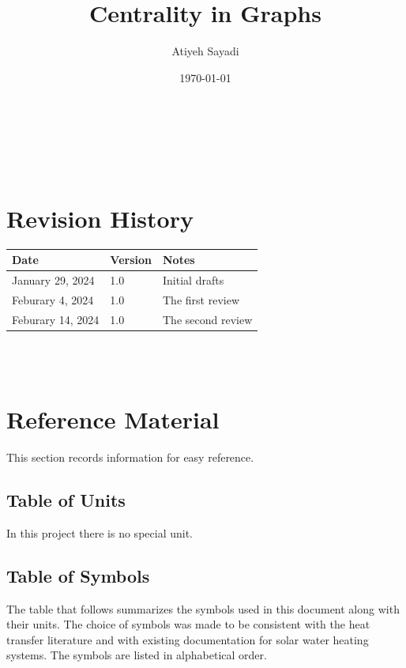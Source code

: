 \documentclass[12pt]{article}
\begin{document}
\title{Centrality in Graphs} 
\author{Atiyeh Sayadi}
\date{\today}
	
\maketitle

~\newpage


\tableofcontents

~\newpage

\section*{Revision History}

\begin{tabularx}{\textwidth}{p{3cm}p{2cm}X}
\toprule {\bf Date} & {\bf Version} & {\bf Notes}\\
\midrule
January 29, 2024  & 1.0 & Initial drafts\\
Feburary 4, 2024  & 1.0 & The first review\\
Feburary 14, 2024  & 1.0 & The second review\\

\bottomrule
\end{tabularx}

~\\

~\newpage

\section{Reference Material}

This section records information for easy reference.

\subsection{Table of Units}

In this project there is no special unit. 

\subsection{Table of Symbols}

The table that follows summarizes the symbols used in this document along with
their units.  The choice of symbols was made to be consistent with the heat
transfer literature and with existing documentation for solar water heating
systems.  The symbols are listed in alphabetical order.
\end{document}
